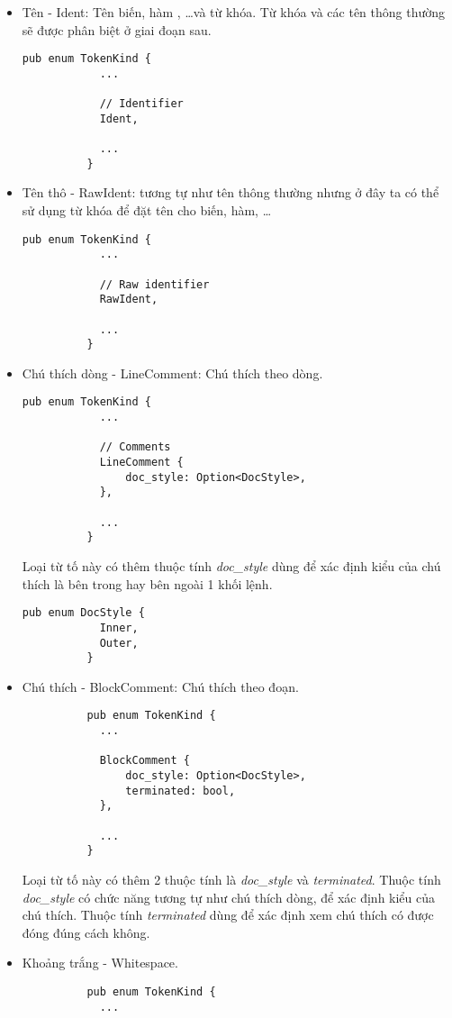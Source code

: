 \begin{itemize}
\begin{itemize}
    \end{itemize}
  \item Tên - Ident: Tên biến, hàm , \dots\space và từ khóa. Từ khóa và các tên thông thường sẽ được phân biệt ở giai đoạn sau.
        \begin{lstlisting}[]
          pub enum TokenKind {
            ...
        
            // Identifier
            Ident,
        
            ...
          }
        \end{lstlisting}
  \item Tên thô - RawIdent: tương tự như tên thông thường nhưng ở đây ta có thể sử dụng từ khóa để đặt tên cho biến, hàm, \dots
        \begin{lstlisting}[]
          pub enum TokenKind {
            ...
        
            // Raw identifier
            RawIdent,
        
            ...
          }
        \end{lstlisting}
  \item Chú thích dòng - LineComment: Chú thích theo dòng. 
        \begin{lstlisting}[]
          pub enum TokenKind {
            ...
        
            // Comments
            LineComment {
                doc_style: Option<DocStyle>,
            },

            ...
          }
        \end{lstlisting}
        Loại từ tố này có thêm thuộc tính \textit{doc\_style} dùng để xác định kiểu của chú thích là bên trong hay bên ngoài 1 khối lệnh.
        \begin{lstlisting}[]
          pub enum DocStyle {
            Inner,
            Outer,
          }
        \end{lstlisting}
  \item Chú thích - BlockComment:  Chú thích theo đoạn. 
        \begin{lstlisting}
          pub enum TokenKind {
            ...

            BlockComment {
                doc_style: Option<DocStyle>,
                terminated: bool,
            },

            ...
          }
        \end{lstlisting}
        Loại từ tố này có thêm 2 thuộc tính là \textit{doc\_style} và \textit{terminated}. Thuộc tính \textit{doc\_style} có chức năng tương tự như chú thích dòng, để xác định kiểu của chú thích. Thuộc tính \textit{terminated} dùng để xác định xem chú thích có được đóng đúng cách không.
  \item Khoảng trắng - Whitespace.
        \begin{lstlisting}
          pub enum TokenKind {
            ...


\end{lstlisting}
\end{itemize}
